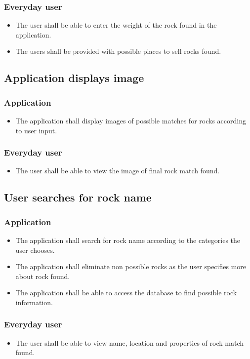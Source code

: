\documentclass[titlepage]{article}
\begin{document}
  \subsubsection{Everyday user}
  \begin{itemize}
  \item The user shall be able to enter the weight of the rock found in the application.
  \item The users shall be provided with possible places to sell rocks found.
  
\end{itemize}

\subsection{Application displays image}
\subsubsection{Application}
\begin{itemize}
\item The application shall display images of possible matches for rocks according to user input.
\end{itemize}
  \subsubsection{Everyday user}
  \begin{itemize}
  \item The user shall be able to view the image of final rock match found.
\end{itemize}


\subsection{User searches for rock name}
\subsubsection{Application}
\begin{itemize}

  \item The application shall search for rock name according to the categories the user chooses.
  \item The application shall eliminate non possible rocks as the user specifies more about rock found. 
  \item The application shall be able to access the database to find possible rock information. 
  \end{itemize}
    \subsubsection{Everyday user}
  \begin{itemize}
  \item The user shall be able to view name, location and properties of rock match found. 
\end{itemize}
\end{document}
